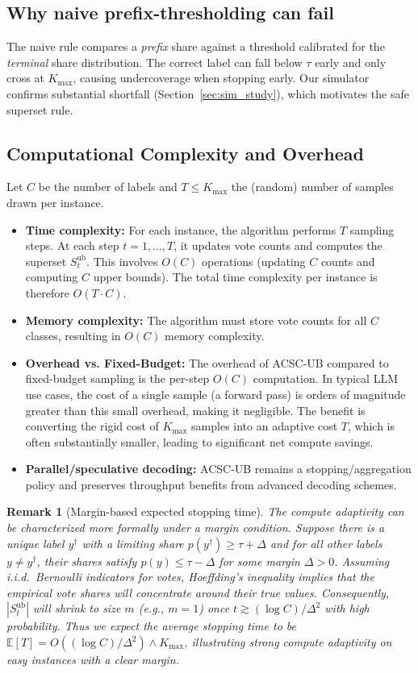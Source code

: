 \documentclass[11pt]{article}
\newtheorem{remark}{Remark}
\begin{document}
\subsection{Why naive prefix-thresholding can fail}
The naive rule compares a \emph{prefix} share against a threshold calibrated for the \emph{terminal} share distribution. The correct label can fall below $\tau$ early and only cross at $K_{\max}$, causing undercoverage when stopping early. Our simulator confirms substantial shortfall (Section~\ref{sec:sim_study}), which motivates the safe superset rule.

\subsection{Computational Complexity and Overhead}
Let $C$ be the number of labels and $T\le K_{\max}$ the (random) number of samples drawn per instance.
\begin{itemize}
\item \textbf{Time complexity:} For each instance, the algorithm performs $T$ sampling steps. At each step $t=1, \dots, T$, it updates vote counts and computes the superset $S_t^{\text{ub}}$. This involves $O(C)$ operations (updating $C$ counts and computing $C$ upper bounds). The total time complexity per instance is therefore $O(T \cdot C)$.
\item \textbf{Memory complexity:} The algorithm must store vote counts for all $C$ classes, resulting in $O(C)$ memory complexity.
\item \textbf{Overhead vs. Fixed-Budget:} The overhead of ACSC-UB compared to fixed-budget sampling is the per-step $O(C)$ computation. In typical LLM use cases, the cost of a single sample (a forward pass) is orders of magnitude greater than this small overhead, making it negligible. The benefit is converting the rigid cost of $K_{\max}$ samples into an adaptive cost $T$, which is often substantially smaller, leading to significant net compute savings.
\item \textbf{Parallel/speculative decoding:} ACSC-UB remains a stopping/aggregation policy and preserves throughput benefits from advanced decoding schemes.
\end{itemize}

\begin{remark}[Margin-based expected stopping time]
The compute adaptivity can be characterized more formally under a margin condition. Suppose there is a unique label $y^\dagger$ with a limiting share $p(y^\dagger)\ge \tau+\Delta$ and for all other labels $y\neq y^\dagger$, their shares satisfy $p(y)\le \tau-\Delta$ for some margin $\Delta>0$. Assuming i.i.d.\ Bernoulli indicators for votes, Hoeffding’s inequality implies that the empirical vote shares will concentrate around their true values. Consequently, $|S_t^{\mathrm{ub}}|$ will shrink to size $m$ (e.g., $m=1$) once $t \gtrsim (\log C)/\Delta^2$ with high probability. Thus we expect the average stopping time to be $\mathbb{E}[T] = O\left((\log C)/\Delta^2\right)\wedge K_{\max}$, illustrating strong compute adaptivity on easy instances with a clear margin.
\end{remark}
\end{document}
